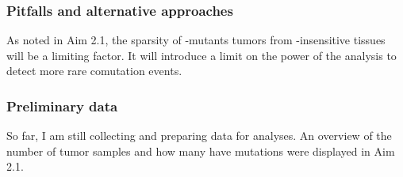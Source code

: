 \subsubsection*{Pitfalls and alternative approaches}

As noted in Aim 2.1, the sparsity of \KRAS{}-mutants tumors from \KRAS{}-insensitive tissues will be a limiting factor.
It will introduce a limit on the power of the analysis to detect more rare comutation events.

\subsubsection*{Preliminary data}

So far, I am still collecting and preparing data for analyses.
An overview of the number of tumor samples and how many have \KRAS{} mutations were displayed in Aim 2.1.

